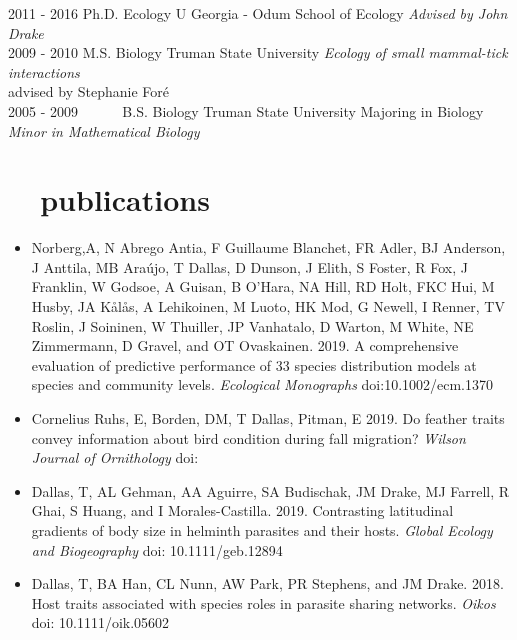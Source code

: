 \documentclass[]{CV}
\begin{document}
\begin{entrylist}
  \entry
    {2011 - 2016}
    {\normalfont Ph.D. Ecology}
    {U Georgia - Odum School of Ecology}
    {\emph{Advised by John Drake}}\\

  \entry
    {2009 - 2010}
    {M.S. Biology}
    {Truman State University}
    {\emph{Ecology of small mammal-tick interactions} \\ advised by Stephanie For\'e}\\

 \entry
    {2005 - 2009 \ \ \ \ \ }
    {B.S. Biology}
    {Truman State University}
    {Majoring in Biology\\
    \emph{Minor in Mathematical Biology}}\\
\end{entrylist}









\section{\faBook \ \  publications}

{}

\begin{itemize}

  \item Norberg,A, N Abrego Antia, F Guillaume Blanchet, FR Adler, BJ Anderson, J Anttila, MB Araújo, {\mefont T Dallas}, D Dunson, J Elith, S Foster, R Fox, J Franklin, W Godsoe, A Guisan, B O'Hara, NA Hill, RD Holt, FKC Hui, M Husby, JA Kålås, A Lehikoinen, M Luoto, HK Mod, G Newell, I Renner, TV Roslin, J Soininen, W Thuiller, JP Vanhatalo, D Warton, M White, NE Zimmermann, D Gravel, and OT Ovaskainen. 2019. A comprehensive evaluation of predictive performance of 33 species distribution models at species and community levels. \textit{Ecological Monographs} doi:10.1002/ecm.1370
    
  \item Cornelius Ruhs, E, Borden, DM, {\mefont T Dallas}, Pitman, E 2019. Do feather traits convey information about bird condition during fall migration? \textit{Wilson Journal of Ornithology} doi:

  \item {\mefont Dallas, T}, AL Gehman, AA Aguirre, SA Budischak, JM Drake, MJ Farrell, R Ghai, S Huang, and I Morales-Castilla. 2019. Contrasting latitudinal gradients of body size in helminth parasites and their hosts. \textit{Global Ecology and Biogeography} doi: 10.1111/geb.12894

\item {\mefont Dallas, T}, BA Han, CL Nunn, AW Park, PR Stephens, and JM Drake. 2018. Host traits associated with species roles in parasite sharing networks. \textit{Oikos} doi: 10.1111/oik.05602
 
\end{itemize}
\end{document}
